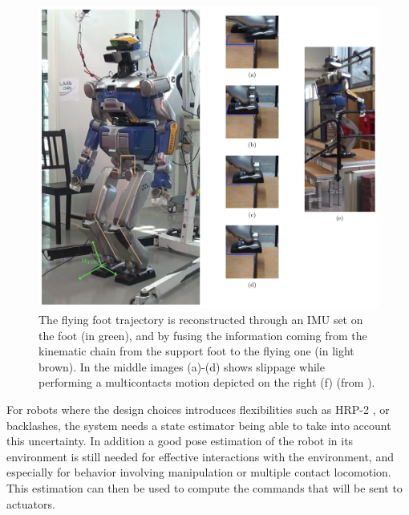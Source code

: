 \begin{figure}
\centering
\includegraphics[width=\linewidth]{./figures/cover-figure.pdf}
	\caption{The flying foot trajectory is reconstructed through an IMU set on the foot (in green), and by fusing the information coming from the kinematic chain
        from the support foot to the flying one (in light brown). In the middle images (a)-(d) shows slippage while performing a multicontacts motion depicted on the
        right (f) (from \cite{Carpentier:ICRA:2016}).
 }
	\label{fig:cover}
\end{figure}

For robots where the design choices introduces flexibilities such as HRP-2 \cite{Nakaoka:iros:2007}, or backlashes,
the system needs a state estimator being able to take into account this uncertainty.
In addition a good pose estimation of the robot in its environment is still needed for effective interactions with the environment,
and especially for behavior involving manipulation or multiple contact locomotion.
This estimation can then be used to compute the commands that will be sent to actuators.
%
%

